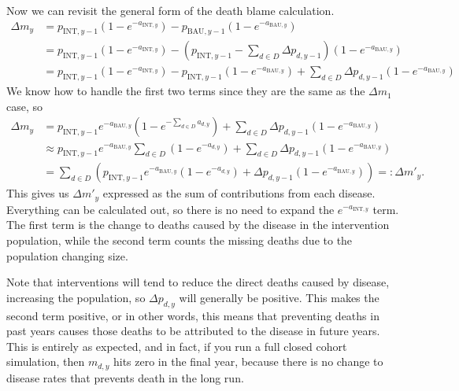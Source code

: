 \documentclass[]{article}
\begin{document}
Now we can revisit the general form of the death blame calculation.
\begin{align*}
	\Delta m_y &= p_{\text{INT}, y - 1} \left(1 - e^{-a_{\text{INT}, y}}\right) - p_{\text{BAU}, y - 1} \left(1 - e^{-a_{\text{BAU}, y}}\right) \\
	&= p_{\text{INT}, y - 1} \left(1 - e^{-a_{\text{INT}, y}}\right) - \left(p_{\text{INT}, y - 1} - \sum_{d \in D} \Delta p_{d, y - 1} \right)  \left(1 - e^{-a_{\text{BAU}, y}}\right) \\
	&= p_{\text{INT}, y - 1} \left(1 - e^{-a_{\text{INT}, y}}\right) - p_{\text{INT}, y - 1} \left(1 - e^{-a_{\text{BAU}, y}}\right)  + \sum_{d \in D} \Delta p_{d, y - 1} \left(1 - e^{-a_{\text{BAU}, y}}\right)
\end{align*}
We know how to handle the first two terms since they are the same as the $\Delta m_1$ case, so 
\begin{align*}
	\Delta m_y &= p_{\text{INT}, y-1} e^{-a_{\text{BAU}, y}} \left(1 - e^{-\sum_{d \in D} a_{d, y}}\right)
	 + \sum_{d \in D} \Delta p_{d, y - 1} \left(1 - e^{-a_{\text{BAU}, y}}\right) \\
	 &\approx p_{\text{INT}, y - 1} e^{-a_{\text{BAU}, y}} \sum_{d \in D} \left(1 - e^{-a_{d, y}}\right)
	 + \sum_{d \in D} \Delta p_{d, y - 1} \left(1 - e^{-a_{\text{BAU}, y}}\right) \\
	 &= \sum_{d \in D} \left(p_{\text{INT}, y - 1} e^{-a_{\text{BAU}, y}} \left(1 - e^{-a_{d, y}}\right)
	 + \Delta p_{d, y - 1} \left(1 - e^{-a_{\text{BAU}, y}}\right) \right) =: \Delta m'_y.
\end{align*}
This gives us $\Delta m'_y$ expressed as the sum of contributions from each disease. Everything can be calculated out, so there is no need to expand the $e^{-a_{\text{INT}, y}}$ term. The first term is the change to deaths caused by the disease in the intervention population, while the second term counts the missing deaths due to the population changing size.

Note that interventions will tend to reduce the direct deaths caused by disease, increasing the population, so $\Delta p_{d, y}$ will generally be positive. This makes the second term positive, or in other words, this means that preventing deaths in past years causes those deaths to be attributed to the disease in future years. This is entirely as expected, and in fact, if you run a full closed cohort simulation, then $m_{d, y}$ hits zero in the final year, because there is no change to disease rates that prevents death in the long run.
\end{document}
